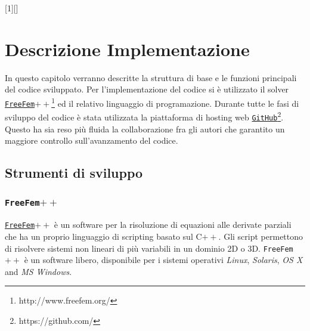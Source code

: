 [1][]{}{}

\section{Descrizione Implementazione}
\label{chap:Code}

In questo capitolo verranno descritte la struttura di base e le funzioni principali del codice sviluppato.
Per l'implementazione del codice si è utilizzato il solver \href{http://www.freefem.org/}\texttt{FreeFem$++$}\footnote{http://www.freefem.org/} ed il relativo linguaggio di programazione. Durante tutte le fasi di sviluppo del codice è stata utilizzata la piattaforma di hosting web \href{https://github.com/}{\texttt{GitHub}}\footnote{https://github.com/}. Questo ha sia reso più fluida la collaborazione fra gli autori che garantito un maggiore controllo sull'avanzamento del codice.

\subsection{Strumenti di sviluppo}
\subsubsection{\texttt{FreeFem$++$}}
\href{http://www.freefem.org/}\texttt{FreeFem$++$} è un software per la risoluzione di equazioni alle derivate parziali che ha un proprio linguaggio di scripting basato sul C$++$. Gli script permettono di risolvere sistemi non lineari di più variabili in un dominio 2D o 3D.
\texttt{FreeFem$++$} è un software libero, disponibile per i sistemi operativi \textit{Linux}, \textit{Solaris}, \textit{OS X} and \textit{MS Windows}.

